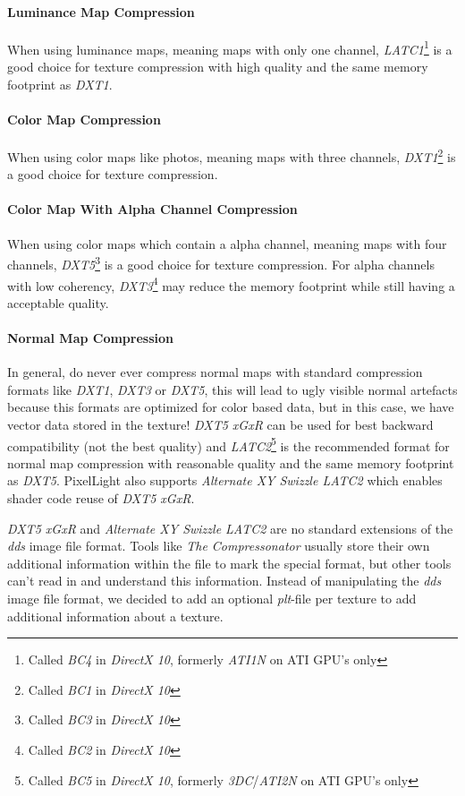 \paragraph{Luminance Map Compression}
When using luminance maps, meaning maps with only one channel, \emph{LATC1}\footnote{Called \emph{BC4} in \emph{DirectX 10}, formerly \emph{ATI1N} on ATI GPU's only} is a good choice for texture compression with high quality and the same memory footprint as \emph{DXT1}.


\paragraph{Color Map Compression}
When using color maps like photos, meaning maps with three channels, \emph{DXT1}\footnote{Called \emph{BC1} in \emph{DirectX 10}} is a good choice for texture compression.


\paragraph{Color Map With Alpha Channel Compression}
When using color maps which contain a alpha channel, meaning maps with four channels, \emph{DXT5}\footnote{Called \emph{BC3} in \emph{DirectX 10}} is a good choice for texture compression. For alpha channels with low coherency, \emph{DXT3}\footnote{Called \emph{BC2} in \emph{DirectX 10}} may reduce the memory footprint while still having a acceptable quality.


\paragraph{Normal Map Compression}
In general, do never ever compress normal maps with standard compression formats like \emph{DXT1}, \emph{DXT3} or \emph{DXT5}, this will lead to ugly visible normal artefacts because this formats are optimized for color based data, but in this case, we have vector data stored in the texture! \emph{DXT5 xGxR} can be used for best backward compatibility (not the best quality) and \emph{LATC2}\footnote{Called \emph{BC5} in \emph{DirectX 10}, formerly \emph{3DC}/\emph{ATI2N} on ATI GPU's only} is the recommended format for normal map compression with reasonable quality and the same memory footprint as \emph{DXT5}. PixelLight also supports \emph{Alternate XY Swizzle LATC2} which enables shader code reuse of \emph{DXT5 xGxR}.

\emph{DXT5 xGxR} and \emph{Alternate XY Swizzle LATC2} are no standard extensions of the \emph{dds} image file format. Tools like \emph{The Compressonator} usually store their own additional information within the file to mark the special format, but other tools can't read in and understand this information. Instead of manipulating the \emph{dds} image file format, we decided to add an optional \emph{plt}-file per texture to add additional information about a texture.

